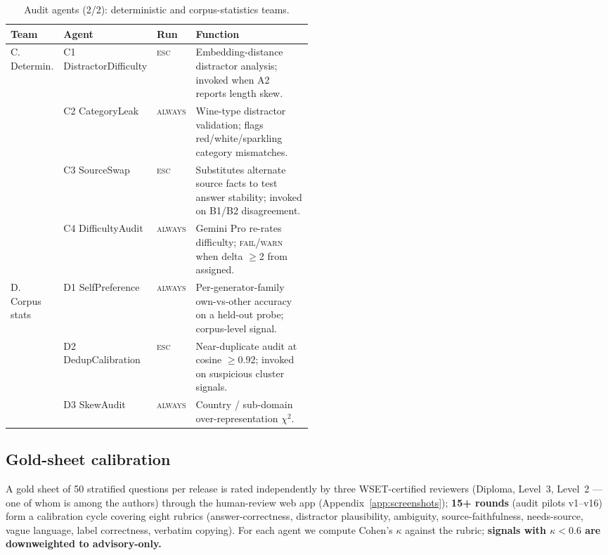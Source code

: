 \begin{table}[h]
  \centering
  \caption{Audit agents (2/2): deterministic and corpus-statistics
    teams.}
  \label{tab:agents-cd}
  \scriptsize
  \setlength{\tabcolsep}{4pt}
  \renewcommand{\arraystretch}{0.95}
  \begin{tabular}{lllp{0.50\linewidth}}
    \toprule
    Team & Agent & Run & Function \\
    \midrule
    \multirow{4}{*}{C. Determin.}
      & C1 DistractorDifficulty  & \textsc{esc}    & Embedding-distance distractor analysis; invoked when A2 reports length skew. \\
      & C2 CategoryLeak          & \textsc{always} & Wine-type distractor validation; flags red/white/sparkling category mismatches. \\
      & C3 SourceSwap            & \textsc{esc}    & Substitutes alternate source facts to test answer stability; invoked on B1/B2 disagreement. \\
      & C4 DifficultyAudit       & \textsc{always} & Gemini Pro re-rates difficulty; \textsc{fail/warn} when delta $\geq$2 from assigned. \\
    \midrule
    \multirow{3}{*}{D. Corpus stats}
      & D1 SelfPreference        & \textsc{always} & Per-generator-family own-vs-other accuracy on a held-out probe; corpus-level signal. \\
      & D2 DedupCalibration      & \textsc{esc}    & Near-duplicate audit at cosine $\geq$0.92; invoked on suspicious cluster signals. \\
      & D3 SkewAudit             & \textsc{always} & Country / sub-domain over-representation $\chi^2$. \\
    \bottomrule
  \end{tabular}
\end{table}

\FloatBarrier
\subsection{Gold-sheet calibration}
\label{sec:gold}
A gold sheet of 50 stratified questions per release is rated independently
by three WSET-certified reviewers (Diploma, Level~3, Level~2 --- one of
whom is among the authors) through the human-review web app
(Appendix~\ref{app:screenshots}); \textbf{15+ rounds} (audit pilots
v1--v16) form a calibration cycle covering eight rubrics
(answer-correctness, distractor plausibility, ambiguity,
source-faithfulness, needs-source, vague language, label correctness,
verbatim copying). For each agent we compute Cohen's $\kappa$ against
the rubric; \textbf{signals with $\kappa<0.6$ are
downweighted to advisory-only.}

